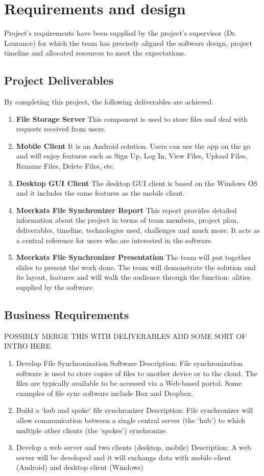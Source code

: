 \documentclass{article}
\begin{document}
\section{Requirements and design}
Project’s requirements have been supplied by the project’s supervisor (Dr. Laurance) for which the team has precisely aligned the software design, project timeline and allocated resources to meet the expectations.

\subsection{Project Deliverables}
By completing this project, the following deliverables are achieved.
\begin{enumerate}
  \item \textbf{File Storage Server} This component is used to store files and deal with requests received from users.
  \item \textbf{Mobile Client} It is an Android solution. Users can use the app on the go and will enjoy features such as Sign Up, Log In, View Files, Upload Files, Rename Files, Delete Files, etc.
  \item \textbf{Desktop GUI Client} The desktop GUI client is based on the Windows OS and it includes the same features as the mobile client.
  \item \textbf{Meerkats File Synchronizer Report} This report provides detailed information about the project in terms of team members, project plan, deliverables, timeline, technologies used, challenges and much more. It acts as a central reference for users who are interested in the software.
  \item \textbf{Meerkats File Synchronizer Presentation} The team will put together slides to present the work done. The team will demonstrate the solution and its layout, features and will walk the audience through the function- alities supplied by the software.
\end{enumerate}


\subsection{Business Requirements}
POSSIBLY MERGE THIS WITH DELIVERABLES
ADD SOME SORT OF INTRO HERE
\begin{enumerate}
  \item Develop File Synchronization Software
  Description:  File synchronization software is used to store copies of files to another device or to the cloud. The files are typically available to be accessed via a Web-based portal. Some examples of file sync software include Box and Dropbox.
  \item Build a ‘hub and spoke‘ file synchronizer
  Description: File synchronizer will allow communication between a single central server (the ‘hub’) to which multiple other clients (the ‘spokes’) synchronize.
  \item Develop a web server and two clients (desktop, mobile)
  Description: A web server will be developed and it will exchange data with mobile client (Android) and desktop client (Windows)
\end{enumerate}
\end{document}
